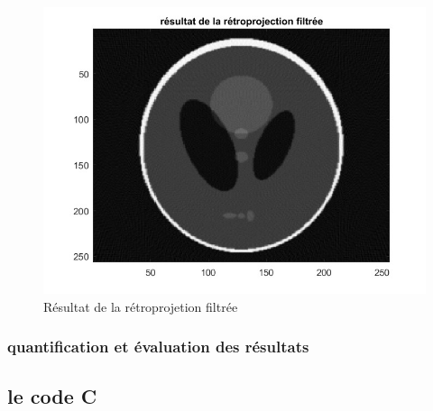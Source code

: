 \documentclass[conference]{IEEEtran}
\begin{document}
\begin{figure}[H]
\centering
\includegraphics[scale=0.4]{rsultat-de-la-rtroprojetion-filtre}
\caption[Résultat de la rétroprojetion filtrée]{Résultat de la rétroprojetion filtrée}
\label{fig:gallery}
\end{figure}


\subsubsection{quantification et évaluation des résultats}

\subsection{le code C}



%
%
\end{document}

